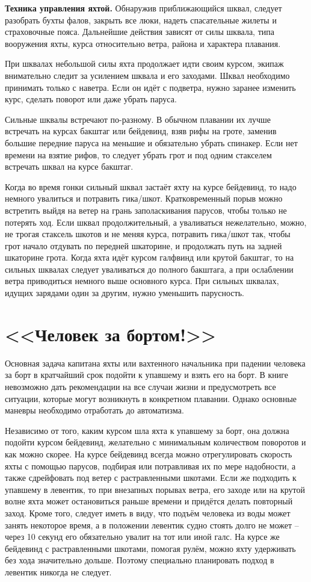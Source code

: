\textbf{Техника управления яхтой.} Обнаружив приближающийся шквал,
следует разобрать бухты фалов, закрыть все люки, надеть спасательные
жилеты и страховочные пояса. Дальнейшие действия зависят от силы
шквала, типа вооружения яхты, курса относительно ветра, района и
характера плавания.

При шквалах небольшой силы яхта продолжает идти своим курсом, экипаж
внимательно следит за усилением шквала и его заходами. Шквал
необходимо принимать только с наветра. Если он идёт с подветра, нужно
заранее изменить курс, сделать поворот или даже убрать паруса.

Сильные шквалы встречают по-разному. В обычном плавании их лучше
встречать на курсах бакштаг или бейдевинд, взяв рифы на гроте, заменив
большие передние паруса на меньшие и обязательно убрать спинакер. Если
нет времени на взятие рифов, то следует убрать грот и под одним
стакселем встречать шквал на курсе бакштаг.

Когда во время гонки сильный шквал застаёт яхту на курсе бейдевинд, то
надо немного увалиться и потравить гика\-/шкот. Кратковременный порыв
можно встретить выйдя на ветер на грань заполаскивания парусов, чтобы
только не потерять ход. Если шквал продолжительный, а уваливаться
нежелательно, можно, не трогая стаксель шкотов и не меняя курса,
потравить гика\-/шкот так, чтобы грот начало отдувать по передней
шкаторине, и продолжать путь на задней шкаторине грота. Когда яхта
идёт курсом галфвинд или крутой бакштаг, то на сильных шквалах следует
уваливаться до полного бакштага, а при ослаблении ветра приводиться
немного выше основного курса. При сильных шквалах, идущих зарядами
один за другим, нужно уменьшить парусность.

\section{<<Человек за бортом!>>}

Основная задача капитана яхты или вахтенного начальника при падении
человека за борт в кратчайший срок подойти к упавшему и взять его на
борт. В книге невозможно дать рекомендации на все случаи жизни и
предусмотреть все ситуации, которые могут возникнуть в конкретном
плавании. Однако основные маневры необходимо отработать до
автоматизма.

Независимо от того, каким курсом шла яхта к упавшему за борт, она
должна подойти курсом бейдевинд, желательно с минимальным количеством
поворотов и как можно скорее. На курсе бейдевинд всегда можно
отрегулировать скорость яхты с помощью парусов, подбирая или
потравливая их по мере надобности, а также сдрейфовать под ветер с
растравленными шкотами. Если же подходить к упавшему в левентик, то
при внезапных порывах ветра, его заходе или на крутой волне яхта может
остановиться раньше времени и придётся делать повторный заход. Кроме
того, следует иметь в виду, что подъём человека из воды может занять
некоторое время, а в положении левентик судно стоять долго не может
\--- через 10 секунд его обязательно увалит на тот или иной
галс. На курсе же бейдевинд с растравленными шкотами, помогая рулём,
можно яхту удерживать без хода значительно дольше. Поэтому специально
планировать подход в левентик никогда не следует.

